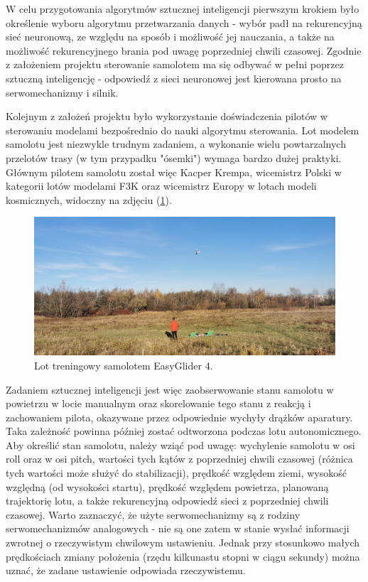 \documentclass[12pt, a4paper]{article}
\let\oldref\ref
\renewcommand{\ref}[1]{(\oldref{#1})}
\begin{document}
W celu przygotowania algorytmów sztucznej inteligencji pierwszym krokiem było określenie wyboru algorytmu przetwarzania danych - wybór padł na rekurencyjną sieć neuronową, ze względu na sposób i możliwość jej nauczania, a także na możliwość rekurencyjnego brania pod uwagę poprzedniej chwili czasowej. Zgodnie z założeniem projektu sterowanie samolotem ma się odbywać w pełni poprzez sztuczną inteligencję - odpowiedź z sieci neuronowej jest kierowana prosto na serwomechanizmy i silnik. 

Kolejnym z założeń projektu było wykorzystanie doświadczenia pilotów w sterowaniu modelami  bezpośrednio do nauki algorytmu sterowania. Lot modelem samolotu jest niezwykle trudnym zadaniem, a wykonanie wielu powtarzalnych przelotów trasy (w tym przypadku "ósemki") wymaga bardzo dużej praktyki. Głównym pilotem samolotu został więc Kacper Krempa, wicemistrz Polski w kategorii lotów modelami F3K oraz wicemistrz Europy w lotach modeli kosmicznych, widoczny na zdjęciu \ref{fig:kacper}.

 \begin{figure}[ht]
    \centering
    \includegraphics[width=1\textwidth]{kacperlata}
    \caption{Lot treningowy samolotem EasyGlider 4.}
    \label{fig:kacper}
\end{figure}


Zadaniem sztucznej inteligencji jest więc zaobserwowanie stanu samolotu w powietrzu w locie manualnym oraz skorelowanie tego stanu z reakcją i zachowaniem pilota, okazywane przez odpowiednie wychyły drążków aparatury. Taka zależność powinna później zostać odtworzona podczas lotu autonomicznego. Aby określić stan samolotu, należy wziąć pod uwagę: wychylenie samolotu w osi roll oraz w osi pitch, wartości tych kątów z poprzedniej chwili czasowej (różnica tych wartości może służyć do stabilizacji), prędkość względem ziemi, wysokość względną (od wysokości startu), prędkość względem powietrza, planowaną trajektorię lotu, a także rekurencyjną odpowiedź sieci z poprzedniej chwili czasowej. Warto zaznaczyć, że użyte serwomechanizmy są z rodziny serwomechanizmów analogowych - nie są one zatem w stanie wysłać informacji zwrotnej o rzeczywistym chwilowym ustawieniu. Jednak przy stosunkowo małych prędkościach zmiany położenia (rzędu kilkunastu stopni w ciągu sekundy) można uznać, że zadane ustawienie odpowiada rzeczywistemu.
\end{document}

